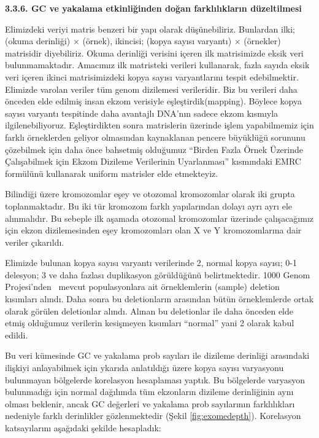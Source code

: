\documentclass[11pt]{article}
\begin{document}
{\bf 3.3.6. GC ve yakalama etkinliğinden doğan farklılıkların düzeltilmesi}

Elimizdeki veriyi matris benzeri bir yapı olarak düşünebiliriz. Bunlardan ilki; (okuma derinliği) $\times$ (örnek), ikincisi; (kopya sayısı varyantı) $\times$ (örnekler) matrisidir  diyebiliriz. Okuma derinliği verisini içeren ilk matrisimizde eksik veri bulunmamaktadır. Amacımız ilk matristeki verileri kullanarak, fazla sayıda eksik veri içeren ikinci matrisimizdeki kopya sayısı varyantlarını tespit edebilmektir. Elimizde varolan veriler tüm genom dizilemesi verileridir. Biz bu verileri daha önceden elde edilmiş insan ekzom verisiyle eşleştirdik(mapping). Böylece kopya sayısı varyantı tespitinde daha avantajlı DNA'nın sadece ekzom kısmıyla ilgilenebiliyoruz. Eşleştirdikten sonra matrislerin üzerinde işlem yapabilmemiz için farklı örneklerden  geliyor olmasından kaynaklanan pencere büyüklüğü sorununu çözebilmek için daha önce bahsetmiş olduğumuz ``Birden Fazla Örnek Üzerinde Çalışabilmek için Ekzom Dizileme Verilerinin Uyarlanması'' kısmındaki EMRC formülünü kullanarak uniform matrisler elde etmekteyiz.

Bilindiği üzere kromozomlar eşey ve otozomal kromozomlar olarak iki grupta toplanmaktadır. Bu iki tür kromozom farklı yapılarından dolayı ayrı ayrı ele alınmalıdır. Bu sebeple ilk aşamada otozomal kromozomlar üzerinde çalışacağımız için ekzon dizilemesinden eşey kromozomları olan X ve Y kromozomlarına dair veriler çıkarıldı. 

Elimizde bulunan kopya sayısı varyantı verilerinde 2, normal kopya sayısı; 0-1 delesyon; 3 ve daha fazlası duplikasyon görüldüğünü belirtmektedir. 1000 Genom Projesi'nden~\cite{1000GP2012} mevcut populasyonlara ait örneklemlerin (sample) deletion kısımları alındı. Daha sonra bu deletionların arasından bütün örneklemlerde ortak olarak görülen deletionlar alındı. Alınan bu deletionlar ile daha önceden elde etmiş olduğumuz verilerin kesişmeyen kısımları ``normal'' yani 2 olarak kabul edildi.

Bu veri kümesinde GC ve yakalama prob sayıları ile dizileme derinliği arasındaki ilişkiyi anlayabilmek için ykarıda anlatıldığı üzere kopya sayısı varyasyonu bulunmayan bölgelerde korelasyon hesaplaması yaptık. Bu bölgelerde varyasyon bulunmadığı için normal dağılımda tüm ekzonların dizileme derinliğinin aynı olması beklenir, ancak GC değerleri ve yakalama prob sayılarının farklılıkları nedeniyle farklı derinlikler gözlenmektedir (Şekil \ref{fig:exomedepth}). Korelasyon katsayılarını aşağıdaki şekilde hesapladık:
\end{document}
